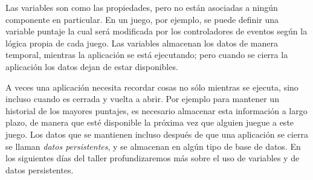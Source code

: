 Las variables son como las propiedades, pero no están asociadas a
ningún componente en particular. En un juego, por ejemplo, se puede
definir una variable puntaje la cual será modificada por los
controladores de eventos según la lógica propia de cada juego. Las
variables almacenan los datos de manera temporal, mientras la
aplicación se está ejecutando; pero cuando se cierra la aplicación los
datos dejan de estar disponibles.

A veces una aplicación necesita recordar cosas no sólo mientras se
ejecuta, sino incluso cuando es cerrada y vuelta a abrir. Por ejemplo
para mantener un historial de los mayores puntajes, es necesario
almacenar esta información a largo plazo, de manera que esté
disponible la próxima vez que alguien juegue a este juego. Los datos
que se mantienen incluso después de que una aplicación se cierra se
llaman \emph{datos persistentes}, y se almacenan en algún tipo de base
de datos. En los siguientes días del taller profundizaremos más sobre
el uso de variables y de datos persistentes.


